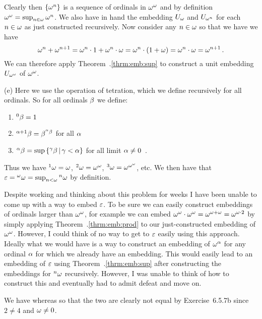 \begin{solution}
    Clearly then $\left\{ \omega^n \right\}$ is a sequence of ordinals in $\omega^\omega$ and by definition $\omega^\omega = \sup_{n \in \omega} \omega^n$.
    We also have in hand the embedding $U_\omega$ and $U_{\omega^n}$ for each $n \in \omega$ as just constructed recursively.
    Now consider any $n \in \omega$ so that we have we have
    $$
    \omega^n + \omega^{n+1} = \omega^n \cdot 1 + \omega^n \cdot \omega = \omega^n \cdot (1 + \omega) = \omega^n \cdot \omega = \omega^{n+1} \,.
    $$
    We can therefore apply Theorem~\ex.\ref{thrm:emb:sup} to construct a unit embedding $U_{\omega^\omega}$ of $\omega^\omega$.

    (e) Here we use the operation of tetration, which we define recursively for all ordinals.
    So for all ordinals $\beta$ we define:
    \begin{enumerate}
        \item ${^{0}\beta} = 1$
        \item ${^{\alpha+1}\beta} = \beta^{{^{\alpha}\beta}}$ for all $\alpha$
        \item ${^{\alpha}\beta} = \sup\left\{ {^{\gamma}\beta} \,|\, \gamma < \alpha \right\}$ for all limit $\alpha \neq 0$ \,.
    \end{enumerate}
    Thus we have ${^{1}\omega} = \omega$, ${^{2}\omega} = \omega^\omega$, ${^{3}\omega} = \omega^{\omega^\omega}$, etc.
    We then have that $\varepsilon = {^{\omega}\omega} = \sup_{n < \omega} {^{n}\omega}$ by definition.

    Despite working and thinking about this problem for weeks I have been unable to come up with a way to embed $\varepsilon$.
    To be sure we can easily construct embeddings of ordinals larger than $\omega^\omega$, for example we can embed $\omega^\omega \cdot \omega^\omega = \omega^{\omega + \omega} = \omega^{\omega \cdot 2}$ by simply applying Theorem~\ex.\ref{thrm:emb:prod} to our just-constructed embedding of $\omega^\omega$.
    However, I could think of no way to get to $\varepsilon$ easily using this approach.
    Ideally what we would have is a way to construct an embedding of $\omega^\alpha$ for any ordinal $\alpha$ for which we already have an embedding.
    This would easily lead to an embedding of $\varepsilon$ using Theorem~\ex.\ref{thrm:emb:sup} after constructing the embeddings for ${^{n}\omega}$ recursively.
    However, I was unable to think of how to construct this and eventually had to admit defeat and move on.
\end{solution}


\begin{solution}
	We have
    whereas
    so that the two are clearly not equal by Exercise~6.5.7b since $2 \neq 4$ and $\omega \neq 0$.
\end{solution}

